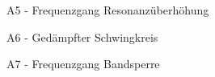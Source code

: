 \documentclass{article}
\begin{document}
\begin{figure}[p]
    \centering
    \caption{A5 - Frequenzgang Resonanzüberhöhung}
    \label{fig:A5_Aufnahme}
\end{figure}

\begin{figure}[p]
    \centering
    \caption{A6 - Gedämpfter Schwingkreis}
    \label{fig:A6_Aufnahme}
\end{figure}

\begin{figure}[p]
    \centering
    \caption{A7 - Frequenzgang Bandsperre}
    \label{fig:A7_Aufnahme}
\end{figure}

\clearpage
\newpage
\end{document}
